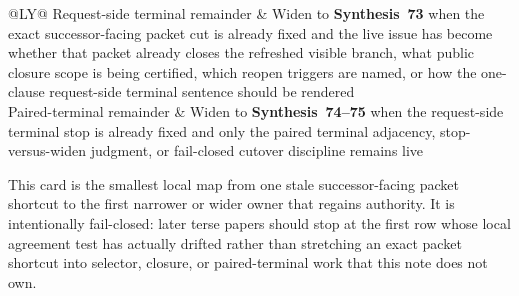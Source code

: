 \documentclass[11pt]{article}
\begin{document}
\begin{center}
\begin{tabularx}{\linewidth}{@{}LY@{}}
Request-side terminal remainder & Widen to \textbf{Synthesis~73} when the exact successor-facing packet cut is already fixed and the live issue has become whether that packet already closes the refreshed visible branch, what public closure scope is being certified, which reopen triggers are named, or how the one-clause request-side terminal sentence should be rendered \\
Paired-terminal remainder & Widen to \textbf{Synthesis~74--75} when the request-side terminal stop is already fixed and only the paired terminal adjacency, stop-versus-widen judgment, or fail-closed cutover discipline remains live \\
\bottomrule
\end{tabularx}
\end{center}

This card is the smallest local map from one stale successor-facing packet shortcut to the first narrower or wider owner that regains authority. It is intentionally fail-closed: later terse papers should stop at the first row whose local agreement test has actually drifted rather than stretching an exact packet shortcut into selector, closure, or paired-terminal work that this note does not own.
\end{document}
